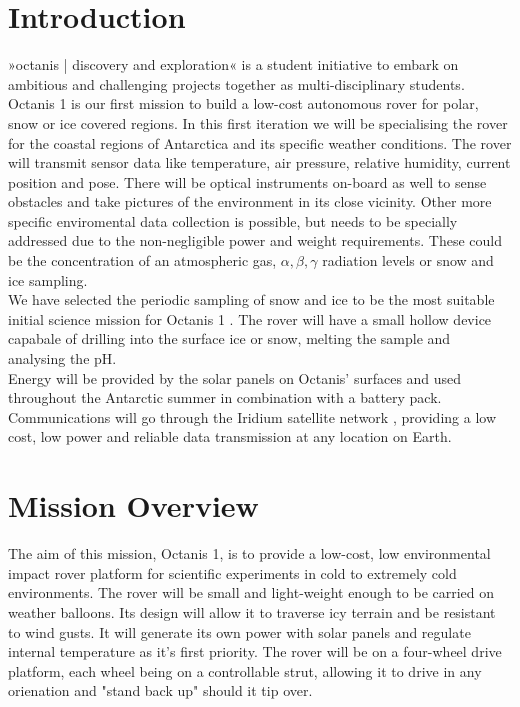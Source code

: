 \documentclass[a4paper,12pt]{article}
\begin{document}
\section{Introduction}
»octanis | discovery and exploration« \cite{octanis} is a student initiative to embark on ambitious and challenging projects together as multi-disciplinary students. Octanis 1 is our first mission to build a low-cost autonomous rover for polar, snow or ice covered regions. In this first iteration we will be specialising the rover for the coastal regions of Antarctica and its specific weather conditions. The rover will transmit sensor data like temperature, air pressure, relative humidity, current position and pose. There will be optical instruments on-board as well to sense obstacles and take pictures of the environment in its close vicinity. Other more specific enviromental data collection is possible, but needs to be specially addressed due to the non-negligible power and weight requirements. These could be the concentration of an atmospheric gas, $\alpha, \beta, \gamma$ radiation levels or snow and ice sampling. \\ We have selected the periodic sampling of snow and ice to be the most suitable initial science mission for Octanis 1 \cite{krishnakant}. The rover will have a small hollow device capabale of drilling into the surface ice or snow, melting the sample and analysing the pH.
\\ Energy will be provided by the solar panels on Octanis' surfaces and used throughout the Antarctic summer in combination with a battery pack. Communications will go through the Iridium satellite network \cite{iridium}, providing a low cost, low power and reliable data transmission at any location on Earth. 



\section{Mission Overview}

The aim of this mission, Octanis 1, is to provide a low-cost, low environmental impact rover platform for scientific experiments in cold to extremely cold environments. The rover will be small and light-weight enough to be carried on weather balloons. Its design will allow it to traverse icy terrain and be resistant to wind gusts. It will generate its own power with solar panels and regulate internal temperature as it's first priority. The rover will be on a four-wheel drive platform, each wheel being on a controllable strut, allowing it to drive in any orienation and "stand back up" should it tip over.
\end{document}
